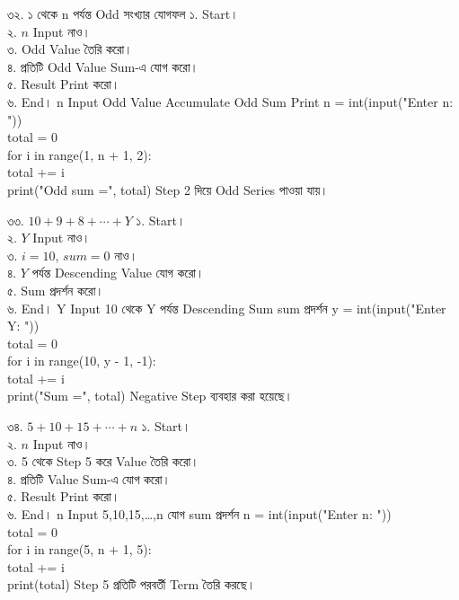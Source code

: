 
\exerciseTable
{৩২. ১ থেকে n পর্যন্ত Odd সংখ্যার যোগফল}
{
১. Start।\\
২. \(n\) Input নাও।\\
৩. Odd Value তৈরি করো।\\
৪. প্রতিটি Odd Value Sum-এ যোগ করো।\\
৫. Result Print করো।\\
৬. End।
}
{
\linearflow
{n Input}
{Odd Value Accumulate}
{Odd Sum Print}
}
{
n = int(input("Enter n: "))\\
total = 0\\
for i in range(1, n + 1, 2):\\
\hspace*{4mm}total += i\\
print("Odd sum =", total)
}
{
Step 2 দিয়ে Odd Series পাওয়া যায়।
}


\exerciseTable
{৩৩. \(10+9+8+\cdots+Y\)}
{
১. Start।\\
২. \(Y\) Input নাও।\\
৩. \(i=10\), \(sum=0\) নাও।\\
৪. \(Y\) পর্যন্ত Descending Value যোগ করো।\\
৫. Sum প্রদর্শন করো।\\
৬. End।
}
{
\linearflow
{Y Input}
{10 থেকে Y পর্যন্ত Descending Sum}
{sum প্রদর্শন}
}
{
y = int(input("Enter Y: "))\\
total = 0\\
for i in range(10, y - 1, -1):\\
\hspace*{4mm}total += i\\
print("Sum =", total)
}
{
Negative Step ব্যবহার করা হয়েছে।
}


\exerciseTable
{৩৪. \(5+10+15+\cdots+n\)}
{
১. Start।\\
২. \(n\) Input নাও।\\
৩. 5 থেকে Step 5 করে Value তৈরি করো।\\
৪. প্রতিটি Value Sum-এ যোগ করো।\\
৫. Result Print করো।\\
৬. End।
}
{
\linearflow
{n Input}
{5,10,15,\dots,n যোগ}
{sum প্রদর্শন}
}
{
n = int(input("Enter n: "))\\
total = 0\\
for i in range(5, n + 1, 5):\\
\hspace*{4mm}total += i\\
print(total)
}
{
Step 5 প্রতিটি পরবর্তী Term তৈরি করছে।
}

